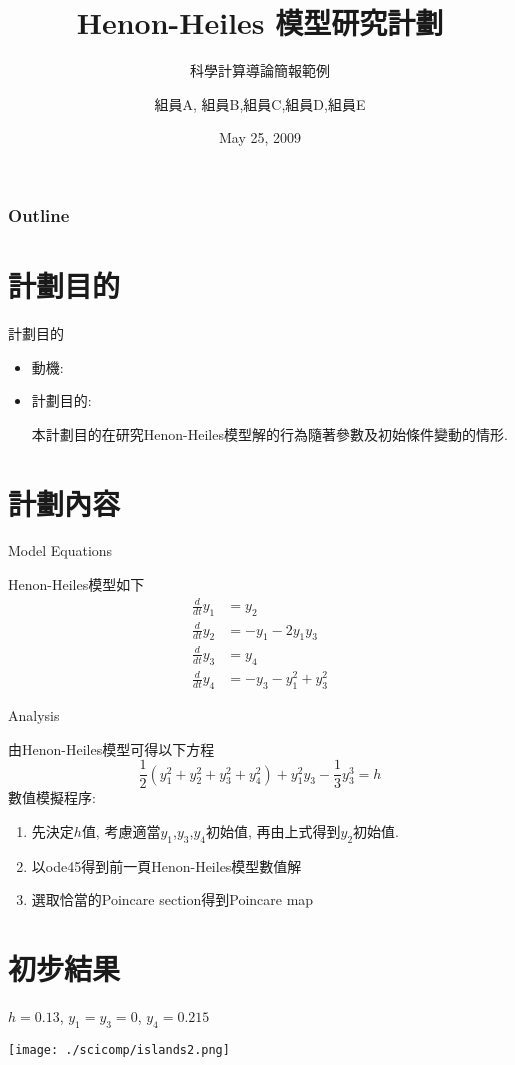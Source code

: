 \documentclass[11pt]{beamer}
\title{Henon-Heiles 模型研究計劃}
\subtitle{科學計算導論簡報範例}
\author{組員A, 組員B,組員C,組員D,組員E}
\institute{Dept. of Math, NCKU, Tainan}
\date{May 25, 2009}
\begin{document}
\frame{\titlepage}
\begin{frame}
  \frametitle{Outline}
  \tableofcontents
\end{frame}

\section{計劃目的}

\begin{frame}{計劃目的}
\begin{itemize}
\item 動機:

\item 計劃目的:

本計劃目的在研究Henon-Heiles模型解的行為隨著參數及初始條件變動的情形.

\end{itemize}
\end{frame}
\section{計劃內容}
\begin{frame}{Model Equations}

Henon-Heiles模型如下
\begin{align*}
\frac{d}{dt}y_1&=y_2\\
\frac{d}{dt}y_2&=-y_1-2 y_1 y_3\\
\frac{d}{dt}y_3&=y_4\\
\frac{d}{dt}y_4&=-y_3-y_1^2+y_3^2
\end{align*}
\end{frame}


\begin{frame}{Analysis}

由Henon-Heiles模型可得以下方程
$$\frac{1}{2}(y_1^2+y_2^2+y_3^2+y_4^2)+y_1^2y_3-\frac{1}{3} y_3^3=h$$
數值模擬程序:
\begin{enumerate}
\item 先決定$h$值, 考慮適當$y_1$,$y_3$,$y_4$初始值,
再由上式得到$y_2$初始值.
\item 以ode45得到前一頁Henon-Heiles模型數值解
\item 選取恰當的Poincare section得到Poincare map
\end{enumerate}
\end{frame}
\section{初步結果}
\begin{frame}{$h=0.13$, $y_1=y_3=0$, $y_4=0.215$}

\texttt{[image: ./scicomp/islands2.png]}
\end{frame}
\end{document}
